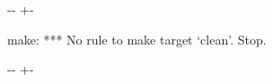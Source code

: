 \documentclass[letterpaper,10pt,english]{sphinxmanual}
\newlength\nbsphinxcodecellspacing
\begin{document}
{

\kern-\sphinxverbatimsmallskipamount\kern-\baselineskip
\kern+\FrameHeightAdjust\kern-\fboxrule
\vspace{\nbsphinxcodecellspacing}

\begin{sphinxVerbatim}[commandchars=\\\{\}]
make: *** No rule to make target `clean'.  Stop.
\end{sphinxVerbatim}
}

{

\kern-\sphinxverbatimsmallskipamount\kern-\baselineskip
\kern+\FrameHeightAdjust\kern-\fboxrule
\vspace{\nbsphinxcodecellspacing}

}
\end{document}
